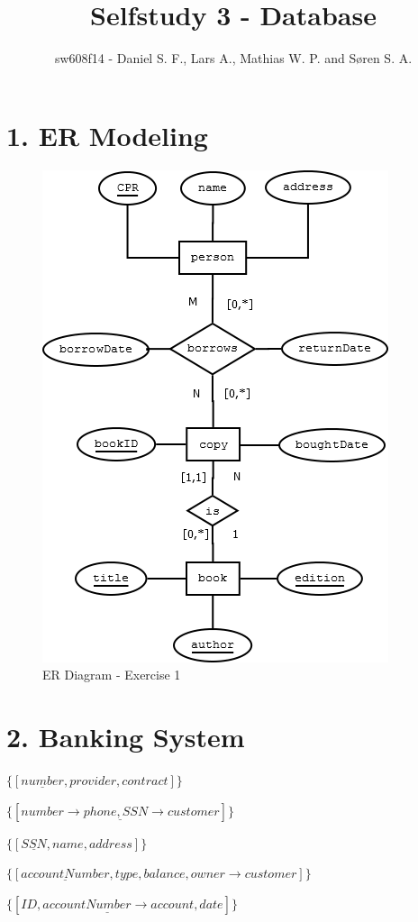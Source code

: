 \documentclass[10pt,a4paper,final]{report}
\title{Selfstudy 3 - Database}
\author{sw608f14 - Daniel S. F., Lars A., Mathias W. P. and Søren S. A.}
\begin{document}
\maketitle

\section*{1. ER Modeling}
\begin{figure}[H]
     \centering
     \includegraphics[scale=0.5]{exercise1}
     \caption{ER Diagram - Exercise 1}
\end{figure}

\section*{2. Banking System}

\begin{description}[style=nextline]
     \item[phone]
     $\{[\underline{number}, provider, contract]\}$
     \item[has           ]
     $\{[\underline{number \rightarrow phone, SSN \rightarrow customer}]\}$
     \item[customer]
     $\{[\underline{SSN}, name, address]\}$
     \item[account]
     $\{[\underline{accountNumber}, type, balance, owner \rightarrow customer]\}$
     \item[statement]
     $\{[\underline{ID, accountNumber \rightarrow account}, date]\}$
\end{description}
\end{document}
